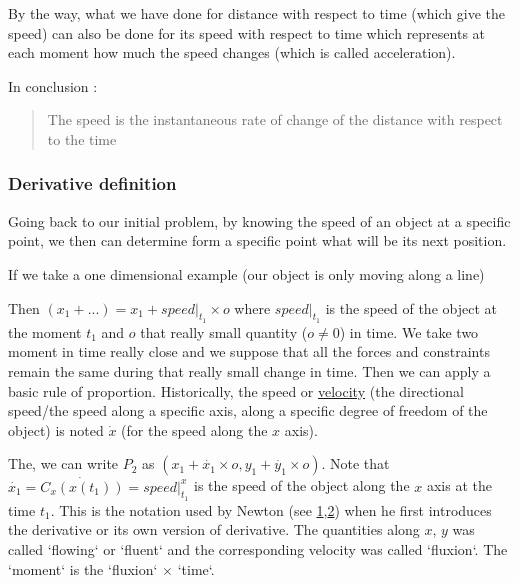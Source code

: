 \documentclass[12pt]{article}
\begin{document}
By the way, what we have done for distance with respect to time (which give the speed) can also be done for its speed with respect to time which represents at each moment how much the speed changes (which is called acceleration).

In conclusion :

\begin{quote}
    The speed is the instantaneous rate of change of the distance with respect to the time
\end{quote}

\subsubsection{Derivative definition}


Going back to our initial problem, by knowing the speed of an object at a specific point, we then can determine form a specific point what will be its next position.

If we take a one dimensional example (our object is only moving along a line)


\begin{figure}[H]
 \centering
 
\end{figure}


Then $(x_1+...) = x_1 + speed|_{t_1} \times o$ where $speed|_{t_1}$ is the speed of the object at the moment $t_1$ and $o$ that really small quantity ($o \neq 0$) in time. We take two moment in time really close and we suppose that all the forces and constraints remain the same during that really small change in time. Then we can apply a basic rule of proportion. Historically, the speed or \href{https://en.wikipedia.org/wiki/Velocity}{velocity} (the directional speed/the speed along a specific axis, along a specific degree of freedom of the object) is noted $\dot{x}$ (for the speed along the $x$ axis).


The, we can write $P_2$ as $(x_1 + \dot{x_1} \times o, y_1 + \dot{y_1} \times o)$. Note that $\dot{x_1} = \dot{C_x(x(t_1))} = speed|^x_{t_1}$ is the speed of the object along the $x$ axis at the time $t_1$. This is the notation used by Newton (see \href{http://www.sfu.ca/~rpyke/fluxions.pdf}{1},\href{https://www.youtube.com/watch?v=i5TFXyI4UMM&ab_channel=Mathoma}{2}) when he first introduces the derivative or its own version of derivative. The quantities along $x$, $y$ was called `flowing` or `fluent` and the corresponding velocity was called `fluxion`. The `moment` is the `fluxion` $\times$ `time`.
\end{document}
